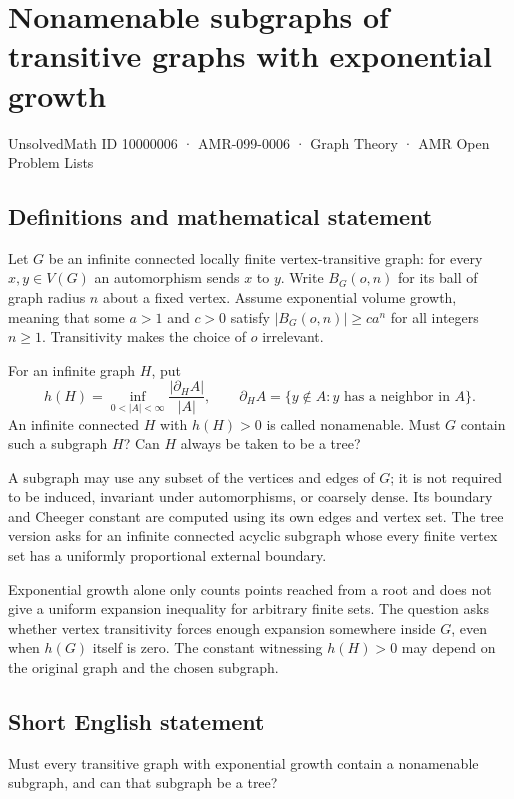 \documentclass[11pt,a4paper]{article}
\begin{document}
\section*{Nonamenable subgraphs of transitive graphs with exponential growth}\label{10000006}
{\small UnsolvedMath ID 10000006 · AMR-099-0006 · Graph Theory · AMR Open Problem Lists}
\subsection{Definitions and mathematical statement}
Let $G$ be an infinite connected locally finite vertex-transitive graph: for every $x,y\in V(G)$ an automorphism sends $x$ to $y$. Write $B_G(o,n)$ for its ball of graph radius $n$ about a fixed vertex. Assume exponential volume growth, meaning that some $a>1$ and $c>0$ satisfy $|B_G(o,n)|\ge ca^n$ for all integers $n\ge1$. Transitivity makes the choice of $o$ irrelevant.

For an infinite graph $H$, put
\[
h(H)=\inf_{0<|A|<\infty}\frac{|\partial_H A|}{|A|},
\qquad
\partial_H A=\{y\notin A:y\text{ has a neighbor in }A\}.
\]
An infinite connected $H$ with $h(H)>0$ is called nonamenable. Must $G$ contain such a subgraph $H$? Can $H$ always be taken to be a tree?

A subgraph may use any subset of the vertices and edges of $G$; it is not required to be induced, invariant under automorphisms, or coarsely dense. Its boundary and Cheeger constant are computed using its own edges and vertex set. The tree version asks for an infinite connected acyclic subgraph whose every finite vertex set has a uniformly proportional external boundary.

Exponential growth alone only counts points reached from a root and does not give a uniform expansion inequality for arbitrary finite sets. The question asks whether vertex transitivity forces enough expansion somewhere inside $G$, even when $h(G)$ itself is zero. The constant witnessing $h(H)>0$ may depend on the original graph and the chosen subgraph.
\subsection{Short English statement}
Must every transitive graph with exponential growth contain a nonamenable subgraph, and can that subgraph be a tree?
\end{document}
